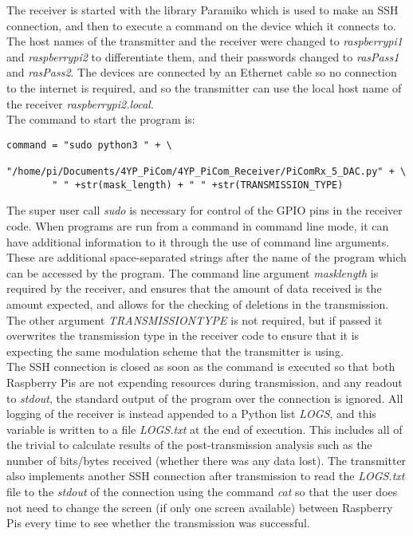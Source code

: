 \documentclass[../main.tex]{subfiles}
\begin{document}
The receiver is started with the library Paramiko \cite{lib_Paramiko} which is used to make an SSH connection, and then to execute a command on the device which it connects to.
The host names of the transmitter and the receiver were changed to \textit{raspberrypi1} and \textit{raspberrypi2} to differentiate them, and their passwords changed to \textit{rasPass1} and \textit{rasPass2}.
The devices are connected by an Ethernet cable so no connection to the internet is required, and so the transmitter can use the local host name of the receiver \textit{raspberrypi2.local}.\\

The command to start the program is:

\begin{lstlisting}[caption=Command Line to Start the Receiver]
	command = "sudo python3 " + \
		"/home/pi/Documents/4YP_PiCom/4YP_PiCom_Receiver/PiComRx_5_DAC.py" + \
		" " +str(mask_length) + " " +str(TRANSMISSION_TYPE)
\end{lstlisting}

The super user call \textit{sudo} is necessary for control of the GPIO pins in the receiver code.
When programs are run from a command in command line mode, it can have additional information to it through the use of command line arguments.
These are additional space-separated strings after the name of the program which can be accessed by the program.
The command line argument \textit{mask\textunderscore length} is required by the receiver, and ensures that the amount of data received is the amount expected, and allows for the checking of deletions in the transmission.
The other argument \textit{TRANSMISSION\textunderscore TYPE} is not required, but if passed it overwrites the transmission type in the receiver code to ensure that it is expecting the same modulation scheme that the transmitter is using.\\

The SSH connection is closed as soon as the command is executed so that both Raspberry Pis are not expending resources during transmission, and any readout to \textit{stdout}, the standard output of the program over the connection is ignored.
All logging of the receiver is instead appended to a Python list \textit{LOGS}, and this variable is written to a file \textit{LOGS.txt} at the end of execution.
This includes all of the trivial to calculate results of the post-transmission analysis such as the number of bits/bytes received (whether there was any data lost).
\todo[inline]{Clearly check below once done}
The transmitter also implements another SSH connection after transmission to read the \textit{LOGS.txt} file to the \textit{stdout} of the connection using the command \textit{cat} so that the user does not need to change the screen (if only one screen available) between Raspberry Pis every time to see whether the transmission was successful.\\
\end{document}
